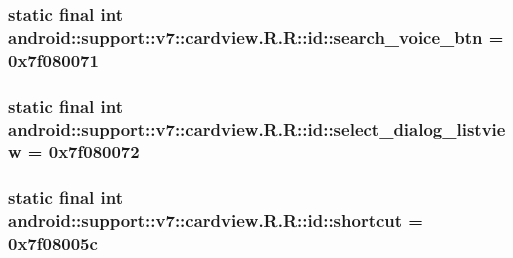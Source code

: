 \hypertarget{classandroid_1_1support_1_1v7_1_1cardview_1_1_r_1_1id_db4a6f09c72106ec13a043be6874d864}{
\subsubsection[{search\_\-voice\_\-btn}]{\setlength{\rightskip}{0pt plus 5cm}static final int android::support::v7::cardview.R.R::id::search\_\-voice\_\-btn = 0x7f080071}}
\label{classandroid_1_1support_1_1v7_1_1cardview_1_1_r_1_1id_db4a6f09c72106ec13a043be6874d864}


\hypertarget{classandroid_1_1support_1_1v7_1_1cardview_1_1_r_1_1id_19743abf2b7df94024e501263d80fdb1}{
\subsubsection[{select\_\-dialog\_\-listview}]{\setlength{\rightskip}{0pt plus 5cm}static final int android::support::v7::cardview.R.R::id::select\_\-dialog\_\-listview = 0x7f080072}}
\label{classandroid_1_1support_1_1v7_1_1cardview_1_1_r_1_1id_19743abf2b7df94024e501263d80fdb1}


\hypertarget{classandroid_1_1support_1_1v7_1_1cardview_1_1_r_1_1id_5cbfc4569ee9d3ce65a70ed446fbc587}{
\subsubsection[{shortcut}]{\setlength{\rightskip}{0pt plus 5cm}static final int android::support::v7::cardview.R.R::id::shortcut = 0x7f08005c}}
\label{classandroid_1_1support_1_1v7_1_1cardview_1_1_r_1_1id_5cbfc4569ee9d3ce65a70ed446fbc587}


